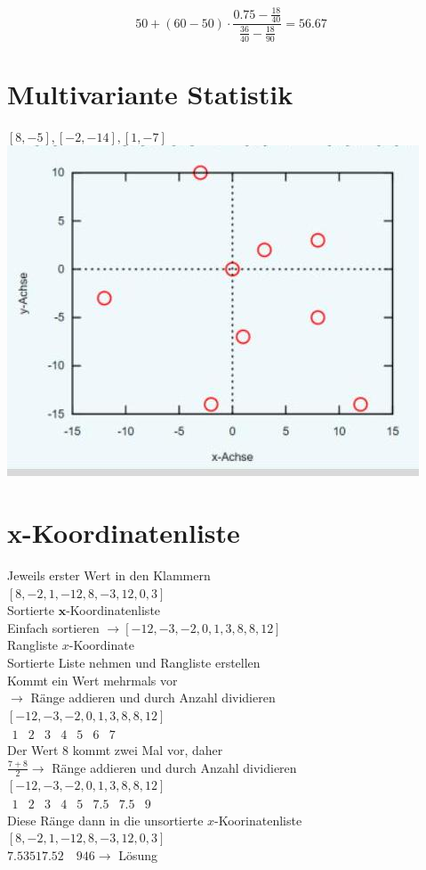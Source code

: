 \documentclass[10pt]{article}
\begin{document}
$$
50+(60-50) \cdot \frac{0.75-\frac{18}{40}}{\frac{36}{40}-\frac{18}{90}}=56.67
$$

\section*{Multivariante Statistik}
$[8,-5],[-2,-14],[1,-7]$\\
\includegraphics[width=\linewidth]{images/2024_12_29_0906b02acf849bda8665g-1(6)}

\section*{x-Koordinatenliste}
Jeweils erster Wert in den Klammern\\
$[8,-2,1,-12,8,-3,12,0,3]$\\
Sortierte $\mathbf{x}$-Koordinatenliste\\
Einfach sortieren $\rightarrow[-12,-3,-2,0,1,3,8,8,12]$\\
Rangliste $x$-Koordinate\\
Sortierte Liste nehmen und Rangliste erstellen\\
Kommt ein Wert mehrmals vor\\
$\rightarrow$ Ränge addieren und durch Anzahl dividieren\\
$[-12,-3,-2,0,1,3,8,8,12]$\\
$\begin{array}{ccccccc}1 & 2 & 3 & 4 & 5 & 6 & 7\end{array}$\\
Der Wert 8 kommt zwei Mal vor, daher\\
$\frac{7+8}{2} \rightarrow$ Ränge addieren und durch Anzahl dividieren\\
$[-12,-3,-2,0,1,3,8,8,12]$\\
$\begin{array}{lllllllll}1 & 2 & 3 & 4 & 5 & 7.5 & 7.5 & 9\end{array}$\\
Diese Ränge dann in die unsortierte $x$-Koorinatenliste\\
$[8,-2,1,-12,8,-3,12,0,3]$\\
$7.53517 .52 \quad 946 \rightarrow$ Lösung
\end{document}

